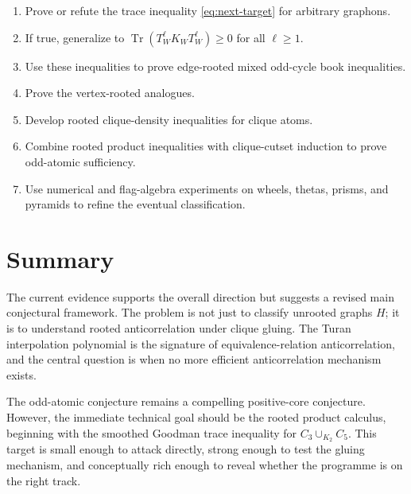 \documentclass[11pt]{article}
\theoremstyle{definition}
\newcommand{\Tr}{\operatorname{Tr}}
\begin{document}
\begin{enumerate}[label=\textbf{Step \arabic*.},leftmargin=*]
\item Prove or refute the trace inequality \eqref{eq:next-target} for arbitrary graphons.
\item If true, generalize to $\Tr(T_W^\ell K_WT_W^\ell)\ge0$ for all $\ell\ge1$.
\item Use these inequalities to prove edge-rooted mixed odd-cycle book inequalities.
\item Prove the vertex-rooted analogues.
\item Develop rooted clique-density inequalities for clique atoms.
\item Combine rooted product inequalities with clique-cutset induction to prove odd-atomic sufficiency.
\item Use numerical and flag-algebra experiments on wheels, thetas, prisms, and pyramids to refine the eventual classification.
\end{enumerate}

\section{Summary}

The current evidence supports the overall direction but suggests a revised main conjectural framework.  The problem is not just to classify unrooted graphs $H$; it is to understand rooted anticorrelation under clique gluing.  The Turan interpolation polynomial is the signature of equivalence-relation anticorrelation, and the central question is when no more efficient anticorrelation mechanism exists.

The odd-atomic conjecture remains a compelling positive-core conjecture.  However, the immediate technical goal should be the rooted product calculus, beginning with the smoothed Goodman trace inequality for $C_3\cup_{K_2}C_5$.  This target is small enough to attack directly, strong enough to test the gluing mechanism, and conceptually rich enough to reveal whether the programme is on the right track.
\end{document}
